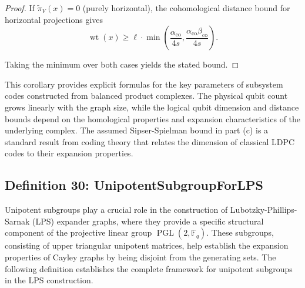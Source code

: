 \documentclass[11pt]{article}
\theoremstyle{plain}
\theoremstyle{definition}
\theoremstyle{remark}
\begin{document}
\begin{proof}
If $\tilde\pi_V(x) = 0$ (purely horizontal), the cohomological distance bound for horizontal projections gives
\[
\operatorname{wt}(x) \geq \ell \cdot \min\left(\frac{\alpha_{\mathrm{co}}}{4s}, \frac{\alpha_{\mathrm{co}} \beta_{\mathrm{co}}}{4s}\right).
\]

Taking the minimum over both cases yields the stated bound.
\end{proof}

This corollary provides explicit formulas for the key parameters of subsystem codes constructed from balanced product complexes. The physical qubit count grows linearly with the graph size, while the logical qubit dimension and distance bounds depend on the homological properties and expansion characteristics of the underlying complex. The assumed Sipser-Spielman bound in part (c) is a standard result from coding theory that relates the dimension of classical LDPC codes to their expansion properties.

\vspace{1em}

\medskip
\noindent{}
\medskip

\subsection{Definition 30: UnipotentSubgroupForLPS}

Unipotent subgroups play a crucial role in the construction of Lubotzky-Phillips-Sarnak (LPS) expander graphs, where they provide a specific structural component of the projective linear group $\operatorname{PGL}(2, \mathbb{F}_q)$. These subgroups, consisting of upper triangular unipotent matrices, help establish the expansion properties of Cayley graphs by being disjoint from the generating sets. The following definition establishes the complete framework for unipotent subgroups in the LPS construction.
\end{document}
